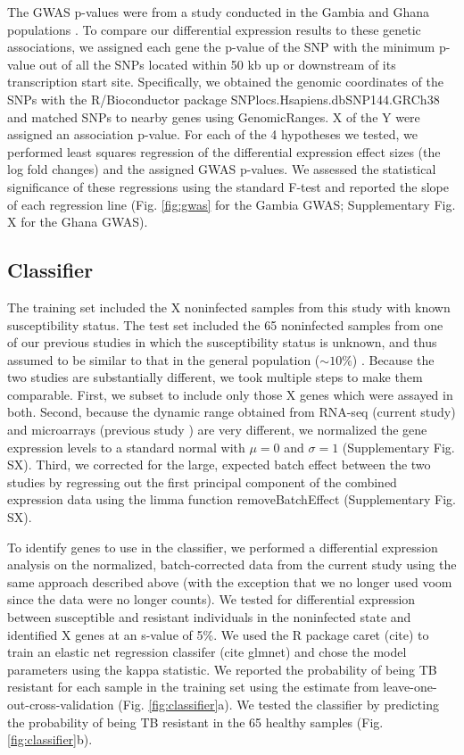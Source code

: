 \documentclass[fleqn,10pt]{wlscirep}
\begin{document}
The GWAS p-values were from a study conducted in the Gambia and Ghana populations \cite{Thye2010}. To compare our differential expression results to these genetic associations, we assigned each gene the p-value of the SNP with the minimum p-value out of all the SNPs located within 50 kb up or downstream of its transcription start site. Specifically, we obtained the genomic coordinates of the SNPs with the R/Bioconductor package SNPlocs.Hsapiens.dbSNP144.GRCh38 and matched SNPs to nearby genes using GenomicRanges. X of the Y were assigned an association p-value. For each of the 4 hypotheses we tested, we performed least squares regression of the differential expression effect sizes (the log fold changes) and the assigned GWAS p-values. We assessed the statistical significance of these regressions using the standard F-test and reported the slope of each regression line (Fig. \ref{fig:gwas} for the Gambia GWAS; Supplementary Fig. X for the Ghana GWAS).
\subsection*{Classifier}

The training set included the X noninfected samples from this study with known susceptibility status. The test set included the 65 noninfected samples from one of our previous studies in which the susceptibility status is unknown, and thus assumed to be similar to that in the general population ($\sim 10\%$) \cite{Barreiro2012}. Because the two studies are substantially different, we took multiple steps to make them comparable. First, we subset to include only those X genes which were assayed in both. Second, because the dynamic range obtained from RNA-seq (current study) and microarrays (previous study \cite{Barreiro2012}) are very different, we normalized the gene expression levels to a standard normal with $\mu = 0$ and $\sigma = 1$ (Supplementary Fig. SX). Third, we corrected for the large, expected batch effect between the two studies by regressing out the first principal component of the combined expression data using the limma function removeBatchEffect \cite{Ritchie2015} (Supplementary Fig. SX).

To identify genes to use in the classifier, we performed a differential expression analysis on the normalized, batch-corrected data from the current study using the same approach described above (with the exception that we no longer used voom since the data were no longer counts). We tested for differential expression between susceptible and resistant individuals in the noninfected state and identified X genes at an s-value of 5\%. We used the R package caret (cite) to train an elastic net regression classifer (cite glmnet) and chose the model parameters using the kappa statistic. We reported the probability of being TB resistant for each sample in the training set using the estimate from leave-one-out-cross-validation (Fig. \ref{fig:classifier}a). We tested the classifier by predicting the probability of being TB resistant in the 65 healthy samples (Fig. \ref{fig:classifier}b).
\end{document}
